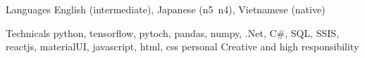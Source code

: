 
\begin{cvskills}
    \cvskill
        {Languages} %
        {English (intermediate), Japanese (n5~n4), Vietnamese (native)} %

    \cvskill
        {Technicals} %
        {python, tensorflow, pytoch, pandas, numpy, .Net, C\#, SQL, SSIS, reactjs, materialUI, javascript, html, css} %
    \cvskill
        {personal}
        {Creative and high responsibility}
\end{cvskills}
